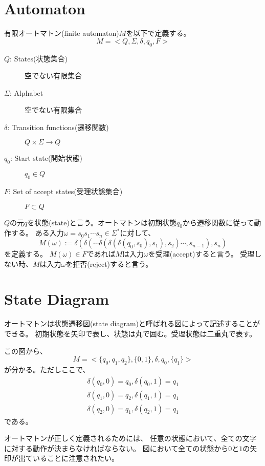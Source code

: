 \documentclass[b5paper,fleqn]{ltjsarticle}
\newcommand\al[1]{\begin{align*}#1\end{align*}}
\begin{document}
\section{Automaton}
有限オートマトン(finite automaton)$M$を以下で定義する。
\[M=<Q,\Sigma,\delta,q_0,F>\]
\begin{description}
\item[$Q$: States(状態集合)] 空でない有限集合
\item[$\Sigma$: Alphabet] 空でない有限集合
\item[$\delta$: Transition functions(遷移関数)] $Q\times\Sigma\rightarrow Q$
\item[$q_0$: Start state(開始状態)] $q_0\in Q$
\item[$F$: Set of accept states(受理状態集合)] $F\subset Q$
\end{description}
$Q$の元$q$を状態(state)と言う。オートマトンは初期状態$q_0$から遷移関数に従って動作する。
ある入力$\omega=s_0s_1\cdots s_n\in\Sigma^*$に対して、
\[M(\omega):=\delta(\delta(\cdots\delta(\delta(\delta(q_0,s_0),s_1),s_2)\cdots,s_{n-1}),s_n)\]を定義する。
$M(\omega)\in F$であれば$M$は入力$\omega$を受理(accept)すると言う。
受理しない時、$M$は入力$\omega$を拒否(reject)すると言う。

\section{State Diagram}
オートマトンは状態遷移図(state diagram)と呼ばれる図によって記述することができる。
初期状態を矢印で表し、状態は丸で囲む。受理状態は二重丸で表す。
\vskip10pt
\vskip5pt
この図から、
\[M=<\{q_0,q_1,q_2\},\{0,1\},\delta,q_0,\{q_1\}>\]
が分かる。ただしここで、
\al{\delta(q_0,0)=q_0, \delta(q_0,1)=q_1\\
\delta(q_1,0)=q_2, \delta(q_1,1)=q_1\\
\delta(q_2,0)=q_1, \delta(q_2,1)=q_1
}である。\par
オートマトンが正しく定義されるためには、
任意の状態において、全ての文字に対する動作が決まらなければならない。
図において全ての状態から$0$と$1$の矢印が出ていることに注意されたい。
\end{document}
